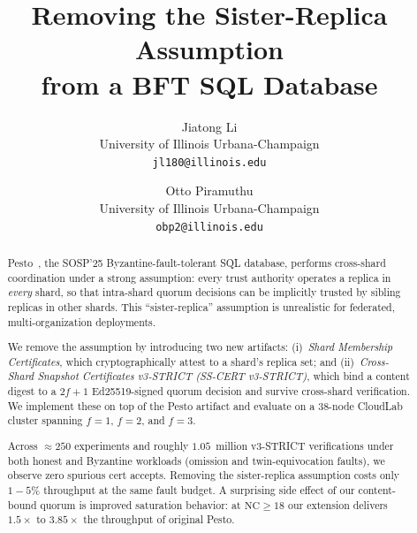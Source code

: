 \documentclass[letterpaper,twocolumn,10pt]{article}
\begin{document}

\date{}

\title{\Large \bf Removing the Sister-Replica Assumption \\
       from a BFT SQL Database}

\author{
{\rm Jiatong Li}\\
University of Illinois Urbana-Champaign\\
\texttt{jl180@illinois.edu}
\and
{\rm Otto Piramuthu}\\
University of Illinois Urbana-Champaign\\
\texttt{obp2@illinois.edu}
}

\maketitle

\begin{abstract}
Pesto~\cite{pesto25}, the SOSP'25 Byzantine-fault-tolerant SQL database,
performs cross-shard coordination under a strong assumption: every
trust authority operates a replica in \emph{every} shard, so that
intra-shard quorum decisions can be implicitly trusted by sibling
replicas in other shards. This ``sister-replica'' assumption is
unrealistic for federated, multi-organization deployments.

We remove the assumption by introducing two new artifacts:
(i)~\emph{Shard Membership Certificates}, which cryptographically attest
to a shard's replica set; and (ii)~\emph{Cross-Shard Snapshot
Certificates v3-STRICT (SS-CERT v3-STRICT)}, which bind a content
digest to a $2f{+}1$ Ed25519-signed quorum decision and survive
cross-shard verification. We implement these on top of the Pesto
artifact and evaluate on a 38-node CloudLab cluster spanning $f{=}1$,
$f{=}2$, and $f{=}3$.

Across $\approx{250}$ experiments and roughly $1.05$~million v3-STRICT
verifications under both honest and Byzantine workloads (omission and
twin-equivocation faults), we observe zero spurious cert accepts.
Removing the sister-replica assumption costs only $1{-}5\%$ throughput
at the same fault budget. A surprising side effect of our content-bound
quorum is improved saturation behavior: at $\mathrm{NC}\geq 18$ our
extension delivers $1.5\times$ to $3.85\times$ the throughput of
original Pesto.
\end{abstract}
\end{document}
